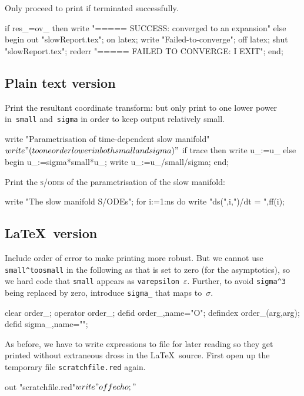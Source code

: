 \documentclass[11pt,a5paper]{article}
\def\sde{\textsc{s/ode}}
\begin{document}
Only proceed to print if terminated successfully.
\begin{reduce}
if res_=ov_ 
  then write "===== SUCCESS: converged to an expansion"
  else begin
      out "slowReport.tex"; on latex;
      write "Failed-to-converge"; 
      off latex; shut "slowReport.tex";
      rederr "===== FAILED TO CONVERGE: I EXIT";
  end;
\end{reduce}


\subsection{Plain text version}

Print the resultant coordinate transform: but only print to
one lower power in~\verb|small| and~\verb|sigma| in order to
keep output relatively small.
\begin{reduce}
write "Parametrisation of time-dependent slow manifold"$
write "(to one order lower in both small and sigma)"$
if trace then write u_:=u_ 
else begin u_:=sigma*small*u_; 
     write u_:=u_/small/sigma; end;
\end{reduce}

Print the \sde{}s of the parametrisation of the slow manifold:
\begin{reduce}
write "The slow manifold S/ODEs";
for i:=1:ns do write "ds(",i,")/dt = ",ff(i);
\end{reduce}



\subsection{\LaTeX\ version}

Include order of error to make printing more robust. But we
cannot use \verb|small^toosmall| in the following as that is
set to zero (for the asymptotics), so we hard code that
\verb|small| appears as \verb|varepsilon|~\(\varepsilon\). 
Further, to avoid \verb|sigma^3| being replaced by zero,
introduce \verb|sigma_| that maps to~\(\sigma\).
\begin{reduce}
clear order_;  operator order_;
defid order_,name="O";
defindex order_(arg,arg);
defid sigma_,name="\sigma";
\end{reduce}


As before, we have to write expressions to file for later
reading so they get printed without extraneous dross in the
\LaTeX\ source. First open up the temporary file
\verb|scratchfile.red| again.
\begin{reduce}
out "scratchfile.red"$
write "off echo;"$ %
\end{reduce}
\end{document}
